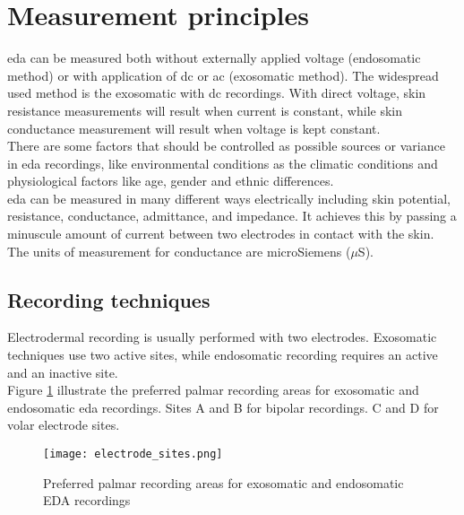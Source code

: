 \section{Measurement principles}
\gls{eda} can be measured both without externally applied voltage (endosomatic method) or with application of \gls{dc} or \gls{ac} (exosomatic method). The widespread used method is the exosomatic with \gls{dc} recordings. With direct voltage, skin resistance measurements will result when current is constant, while skin conductance measurement will result when voltage is kept constant.
\\ \indent
There are some factors that should be controlled as possible sources or variance in \gls{eda} recordings, like environmental conditions as the climatic conditions and physiological factors like age, gender and ethnic differences.
\\ \indent
\gls{eda} can be measured in many different ways electrically including skin potential, resistance, conductance, admittance, and impedance. It achieves this by passing a minuscule amount of current between two electrodes in contact with the skin. The units of measurement for conductance are microSiemens ($\mu$S).

\subsection{Recording techniques}
Electrodermal recording is usually performed with two electrodes. Exosomatic techniques use two active sites, while endosomatic recording requires an active and an inactive site.
\\
Figure \ref{fig:electrode_sites} illustrate the preferred palmar recording areas for exosomatic and endosomatic \gls{eda} recordings. Sites A and B for bipolar recordings. C and D for volar electrode sites.
\begin{figure}[h]
    \centering
    \texttt{[image: electrode\_sites.png]} 
	\caption{Preferred palmar recording areas for exosomatic and endosomatic EDA recordings}
    \label{fig:electrode_sites}
\end{figure}

